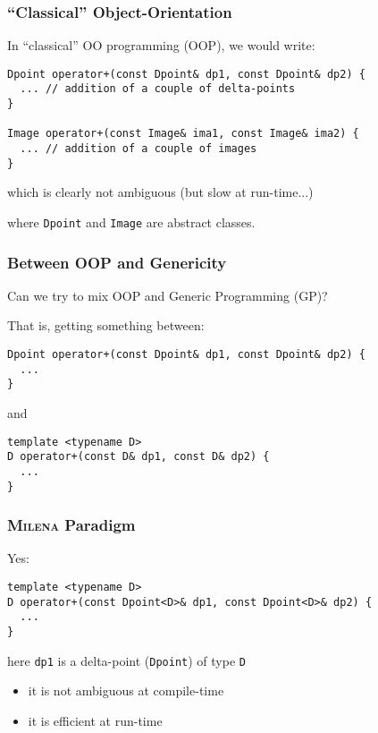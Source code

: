 \documentclass{beamer}
\newcommand{\code}[1]{{\scriptsize{\texttt{#1}}}\xspace}
\newcommand{\mln}{\textsc{Milena}\xspace}
\begin{document}
\begin{frame}[fragile]
  \frametitle{``Classical'' Object-Orientation}

In ``classical'' OO programming (OOP), we would write:
\begin{lstlisting}
Dpoint operator+(const Dpoint& dp1, const Dpoint& dp2) {
  ... // addition of a couple of delta-points
}

Image operator+(const Image& ima1, const Image& ima2) {
  ... // addition of a couple of images
}
\end{lstlisting}
which is clearly not ambiguous (but slow at run-time...)

where \code{Dpoint} and \code{Image} are abstract classes.

\end{frame}


\begin{frame}[fragile]
  \frametitle{Between OOP and Genericity}

Can we try to mix OOP and Generic Programming (GP)?

\medskip

That is, getting something between:

\begin{lstlisting}
Dpoint operator+(const Dpoint& dp1, const Dpoint& dp2) {
  ...
}
\end{lstlisting}
and
\begin{lstlisting}
template <typename D>
D operator+(const D& dp1, const D& dp2) {
  ...
}
\end{lstlisting}

\end{frame}



\begin{frame}[fragile]
  \frametitle{\mln Paradigm}

Yes:

\begin{lstlisting}
template <typename D>
D operator+(const Dpoint<D>& dp1, const Dpoint<D>& dp2) {
  ...
}
\end{lstlisting}

\begin{center}
  here \code{dp1} is a delta-point (\code{Dpoint}) of type \code{D}
\end{center}

\medskip

\begin{itemize}
\item it is not ambiguous at compile-time
\item it is efficient at run-time\\
  \scriptsize{}
\end{itemize}

\end{frame}
\end{document}
